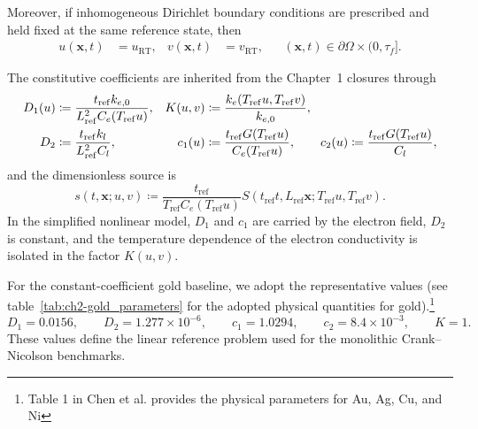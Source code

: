 Moreover, if inhomogeneous Dirichlet boundary conditions are prescribed and held fixed at the same reference state, then
\begin{align}
    u(\mathbf{x},t) & = u_{\mathrm{RT}},
                    &
    v(\mathbf{x},t) & = v_{\mathrm{RT}},
                    &                    & (\mathbf{x},t)\in \partial\Omega \times (0,\tau_f].
\end{align}

\noindent
The constitutive coefficients are inherited from the Chapter~1 closures through
\begin{align}
    D_1(u) & \coloneqq \frac{t_{\mathrm{ref}} k_{e,0}}{L_{\mathrm{ref}}^2 C_e(T_{\mathrm{ref}}u)},  &
    K(u,v) & \coloneqq \frac{k_e(T_{\mathrm{ref}}u, T_{\mathrm{ref}}v)}{k_{e,0}}, \notag              \\
    D_2    & \coloneqq \frac{t_{\mathrm{ref}} k_l}{L_{\mathrm{ref}}^2 C_l},                         &
    c_1(u) & \coloneqq \frac{t_{\mathrm{ref}} G(T_{\mathrm{ref}}u)}{C_e(T_{\mathrm{ref}}u)}, \qquad
    c_2(u) \coloneqq \frac{t_{\mathrm{ref}} G(T_{\mathrm{ref}}u)}{C_l}, \label{eq:ch2-dimensionless-coeffs}
\end{align}
and the dimensionless source is
\begin{equation}
    s(t,\mathbf{x};u,v) \coloneqq \frac{t_{\mathrm{ref}}}{T_{\mathrm{ref}} C_e(T_{\mathrm{ref}}u)}
    S(t_{\mathrm{ref}} t, L_{\mathrm{ref}}\mathbf{x}; T_{\mathrm{ref}}u, T_{\mathrm{ref}}v).
\end{equation}
In the simplified nonlinear model, $D_1$ and $c_1$ are carried by the electron field, $D_2$ is constant, and the temperature dependence of the electron conductivity is isolated in the factor $K(u,v)$.

For the constant-coefficient gold baseline, we adopt the representative values
(see table~\ref{tab:ch2-gold_parameters} for the adopted physical quantities for gold).\footnote{Table 1 in Chen et al. \cite{Chen_2010} provides the physical parameters for Au, Ag, Cu, and Ni}
\begin{equation}
    \label{eq:ch2-linear-params}
    D_1 = 0.0156, \qquad
    D_2 = 1.277 \times 10^{-6}, \qquad
    c_1 = 1.0294, \qquad
    c_2 = 8.4 \times 10^{-3}, \qquad
    K = 1.
\end{equation}
These values define the linear reference problem used for the monolithic Crank--Nicolson benchmarks.

